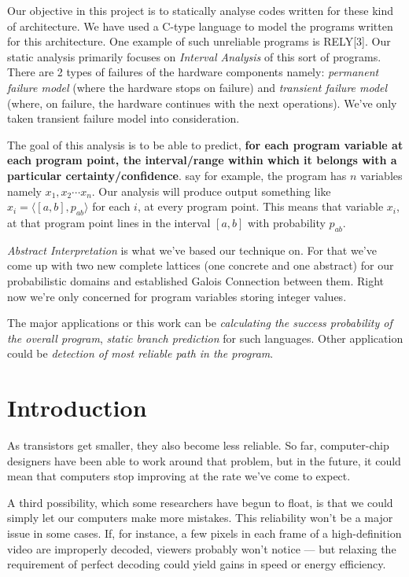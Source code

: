 \documentclass[final,3p, review, times]{util/elsarticle}
\begin{document}
Our objective in this project is to statically analyse codes written for these kind of architecture. We have used a C-type language to model the programs written for this architecture. One example of such unreliable programs is RELY[3]. Our static analysis primarily focuses on \textit{Interval Analysis} of this sort of programs.  There are 2 types of failures of the hardware components namely: \emph{permanent failure model} (where the hardware stops on failure) and \emph{transient failure model} (where, on failure, the hardware continues with the next operations). We've only taken transient failure model into consideration.

The goal of this analysis is to be able to predict, \textbf{for each program variable at each program point, the interval/range within which it belongs with a particular certainty/confidence}. say for example, the program has $n$ variables namely $x_1,x_2\cdots x_n$. Our analysis will produce output something like $x_i=\langle[a,b],p_{ab}\rangle$ for each $i$, at every program point. This means that variable $x_i$, at that program point lines in the interval $[a,b]$ with probability $p_{ab}$.

\emph{Abstract Interpretation} is what we've based our technique on. For that we've come up with two new complete lattices (one concrete and one abstract) for our probabilistic domains and established Galois Connection between them. Right now we're only concerned for program variables storing integer values.

The major applications or this work can be \emph{calculating the success probability of the overall program}, \emph{static branch prediction} for such languages. Other application could be \emph{detection of most reliable path in the program}.
\clearpage



\section{Introduction}

As transistors get smaller, they also become less reliable. So far, computer-chip designers have been able to work around that problem, but in the future, it could mean that computers stop improving at the rate we’ve come to expect.

A third possibility, which some researchers have begun to float, is that we could simply let our computers make more mistakes. This reliability won't be a major issue in some cases. If, for instance, a few pixels in each frame of a high-definition video are improperly decoded, viewers probably won’t notice --- but relaxing the requirement of perfect decoding could yield gains in speed or energy efficiency.
\end{document}
